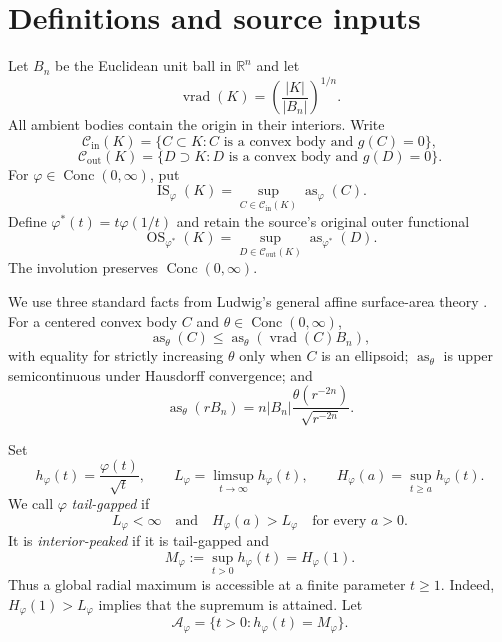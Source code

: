 \documentclass[11pt]{article}
\newcommand{\R}{\mathbb{R}}
\newcommand{\as}{\operatorname{as}}
\newcommand{\IS}{\operatorname{IS}}
\newcommand{\OS}{\operatorname{OS}}
\newcommand{\vrad}{\operatorname{vrad}}
\newcommand{\Cin}{\mathcal C_{\mathrm{in}}}
\newcommand{\Cout}{\mathcal C_{\mathrm{out}}}
\begin{document}
\section{Definitions and source inputs}

Let $B_n$ be the Euclidean unit ball in $\R^n$ and let
\[
 \vrad(K)=\left(\frac{|K|}{|B_n|}\right)^{1/n}.
\]
All ambient bodies contain the origin in their interiors.  Write
\[
 \Cin(K)=\{C\subset K:C\text{ is a convex body and }g(C)=0\},
\]
\[
 \Cout(K)=\{D\supset K:D\text{ is a convex body and }g(D)=0\}.
\]
For $\varphi\in\operatorname{Conc}(0,\infty)$, put
\[
 \IS_\varphi(K)=\sup_{C\in\Cin(K)}\as_\varphi(C).
\]
Define $\varphi^*(t)=t\varphi(1/t)$ and retain the source's original outer
functional
\[
 \OS_{\varphi^*}(K)=\sup_{D\in\Cout(K)}\as_{\varphi^*}(D).
\]
The involution preserves $\operatorname{Conc}(0,\infty)$.

We use three standard facts from Ludwig's general affine surface-area theory
\cite{Ludwig}.  For a centered convex body $C$ and
$\theta\in\operatorname{Conc}(0,\infty)$,
\begin{equation}\label{eq:ludwig}
 \as_\theta(C)\leq\as_\theta(\vrad(C)B_n),
\end{equation}
with equality for strictly increasing $\theta$ only when $C$ is an
ellipsoid; $\as_\theta$ is upper semicontinuous under Hausdorff convergence;
and
\begin{equation}\label{eq:ball}
 \as_\theta(rB_n)=n|B_n|\frac{\theta(r^{-2n})}{\sqrt{r^{-2n}}}.
\end{equation}

Set
\[
 h_\varphi(t)=\frac{\varphi(t)}{\sqrt t},\qquad
 L_\varphi=\limsup_{t\to\infty}h_\varphi(t),\qquad
 H_\varphi(a)=\sup_{t\geq a}h_\varphi(t).
\]
We call $\varphi$ \emph{tail-gapped} if
\begin{equation}\label{eq:tailgap}
 L_\varphi<\infty
 \quad\text{and}\quad
 H_\varphi(a)>L_\varphi\quad\text{for every }a>0.
\end{equation}
It is \emph{interior-peaked} if it is tail-gapped and
\begin{equation}\label{eq:peak}
 M_\varphi:=\sup_{t>0}h_\varphi(t)=H_\varphi(1).
\end{equation}
Thus a global radial maximum is accessible at a finite parameter $t\geq1$.
Indeed, $H_\varphi(1)>L_\varphi$ implies that the supremum is attained.  Let
\begin{equation}\label{eq:argmax}
 \mathcal A_\varphi=\{t>0:h_\varphi(t)=M_\varphi\}.
\end{equation}
\end{document}
